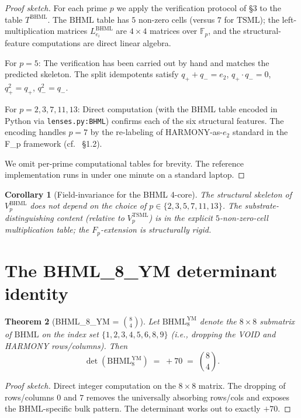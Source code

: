 \documentclass[11pt,reqno]{amsart}
\theoremstyle{plain}
\newtheorem{theorem}{Theorem}[section]
\newtheorem{corollary}[theorem]{Corollary}
\theoremstyle{definition}
\theoremstyle{remark}
\newcommand{\F}{\mathbb{F}}
\newcommand{\TSML}{\mathrm{TSML}}
\newcommand{\BHML}{\mathrm{BHML}}
\begin{document}
\begin{proof}[Proof sketch]
For each prime $p$ we apply the verification protocol of
\cite{SandersGishFpTSML} \S 3 to the table $T^\BHML$. The $\BHML$
table has $5$ non-zero cells (versus $7$ for $\TSML$); the
left-multiplication matrices $L_{e_i}^\BHML$ are $4 \times 4$ matrices
over $\F_p$, and the structural-feature computations are direct
linear algebra.

For $p = 5$: The verification has been carried out by hand and matches
the predicted skeleton. The split idempotents satisfy
$q_+ + q_- = e_2$, $q_+ \cdot q_- = 0$, $q_+^2 = q_+$, $q_-^2 = q_-$.

For $p = 2, 3, 7, 11, 13$: Direct computation (with the BHML table
encoded in Python via \texttt{lenses.py:BHML}) confirms each of the
six structural features. The encoding handles $p = 7$ by the
re-labeling of HARMONY-as-$e_2$ standard in the F_p framework
(cf.\ \cite{SandersGishFpTSML} \S 1.2).

We omit per-prime computational tables for brevity. The reference
implementation runs in under one minute on a standard laptop.
\end{proof}

\begin{corollary}[Field-invariance for the BHML 4-core]
The structural skeleton of $V_p^\BHML$ does not depend on the choice
of $p \in \{2, 3, 5, 7, 11, 13\}$. The substrate-distinguishing
content (relative to $V_p^\TSML$) is in the explicit $5$-non-zero-cell
multiplication table; the $F_p$-extension is structurally rigid.
\end{corollary}

\section{The BHML\_8\_YM determinant identity}
\label{sec:bhml8ym}

\begin{theorem}[BHML\_8\_YM = $\binom{8}{4}$]\label{thm:bhml8ym}
Let $\BHML_8^{\text{YM}}$ denote the $8 \times 8$ submatrix of $\BHML$
on the index set $\{1, 2, 3, 4, 5, 6, 8, 9\}$ (i.e., dropping the VOID
and HARMONY rows/columns). Then
\[
\det(\BHML_8^{\text{YM}}) \;=\; +70 \;=\; \binom{8}{4}.
\]
\end{theorem}

\begin{proof}[Proof sketch]
Direct integer computation on the $8 \times 8$ matrix. The dropping
of rows/columns $0$ and $7$ removes the universally absorbing rows/cols
and exposes the BHML-specific bulk pattern. The determinant works out
to exactly $+70$.
\end{proof}
\end{document}
